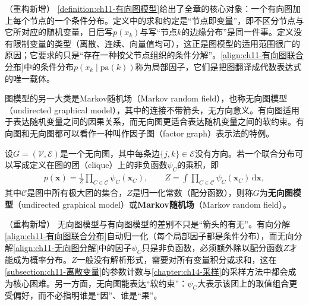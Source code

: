 \documentclass[../../main.tex]{subfiles}
\begin{document}
\begin{remark}（重构新增）
\cref{definition:ch11-有向图模型}给出了全章的核心对象：一个有向图加上每个节点的一个条件分布。定义中的求和约定是“节点即变量”，即不区分节点与它所对应的随机变量，日后写$p(x_k)$与写“节点$k$的边缘分布”是同一件事。定义没有限制变量的类型（离散、连续、向量值均可），这正是图模型的适用范围很广的原因；它要求的只是“存在一种按父节点组织的条件分解”。\eqref{align:ch11-有向图联合分布}中的条件分布$p(x_k\mid \mathrm{pa}(k))$称为局部因子，它们是把图翻译成代数表达式的唯一载体。
\end{remark}

图模型的另一大类是Markov随机场（Markov random field），也称无向图模型（undirected graphical model），其中的连接不带箭头，无方向意义。有向图适用于表达随机变量之间的因果关系，而无向图更适合表达随机变量之间的软约束。有向图和无向图都可以看作一种叫作因子图（factor graph）表示法的特例。

\begin{definition}[无向图模型]\label{definition:ch11-无向图模型}
设$G=(\mathcal{V},\mathcal{E})$是一个无向图，其中每条边$\{j,k\}\in\mathcal{E}$没有方向。若一个联合分布可以写成定义在图的团（clique）上的非负函数$\psi_C$的乘积，即
\begin{align}
  p(\mathbf{x}) = \frac{1}{Z}\prod_{C\in\mathcal{C}}\psi_C(\mathbf{x}_C),\qquad
  Z=\int\prod_{C\in\mathcal{C}}\psi_C(\mathbf{x}_C)\,\mathrm{d}\mathbf{x},
  \label{align:ch11-无向图分解}
\end{align}
其中$\mathcal{C}$是图中所有极大团的集合，$Z$是归一化常数（配分函数），则称$G$为\textbf{无向图模型}（undirected graphical model）或\textbf{Markov随机场}（Markov random field）。
\end{definition}

\begin{remark}（重构新增）
无向图模型与有向图模型的差别不只是“箭头的有无”。有向分解\eqref{align:ch11-有向图联合分布}自动归一化（每个局部因子都是条件分布），而无向分解\eqref{align:ch11-无向图分解}中的因子$\psi_C$只是非负函数，必须额外除以配分函数$Z$才能成为概率分布。$Z$一般没有解析形式，需要对所有变量积分或求和，这在\cref{subsection:ch11-离散变量}的参数计数与\cref{chapter:ch14-采样}的采样方法中都会成为核心困难。另一方面，无向图能表达“软约束”：$\psi_C$大表示该团上的取值组合更受偏好，而不必指明谁是“因”、谁是“果”。
\end{remark}
\end{document}
